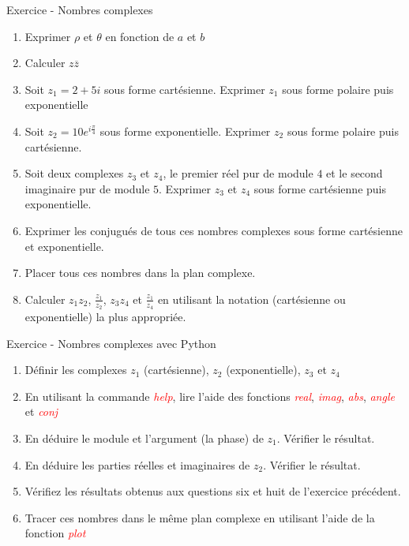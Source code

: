 \documentclass{beamer}
\newcounter{exampleBlockCounter}
\begin{document}
\begin{frame} 
	\begin{exampleblock}{Exercice  -  Nombres complexes}
		\begin{enumerate}\justifying
			  \item Exprimer $\rho$ et $\theta$ en fonction de $a$ et $b$
			  \item Calculer $z \overline{z}$
			  \item Soit $z_1=2+5i$ sous forme cartésienne. Exprimer $z_1$ sous forme
			  polaire puis exponentielle
			  \item Soit $z_2=10e^{i\frac{\pi}{4}}$ sous forme exponentielle. Exprimer
			  $z_2$ sous forme polaire puis cartésienne.
			  \item Soit deux complexes $z_3$ et $z_4$, le premier réel pur de module
			  $4$ et le second imaginaire pur de module $5$. Exprimer $z_3$ et $z_4$
			  sous forme cartésienne puis exponentielle.
			  \item Exprimer les conjugués de tous ces nombres complexes sous forme
			  cartésienne et exponentielle.
			  \item Placer tous ces nombres dans la plan complexe.
			  \item Calculer $z_1z_2$, $\frac{z_1}{z_2}$, $z_3z_4$ et $\frac{z_1}{z_4}$
			  en utilisant la notation (cartésienne ou exponentielle) la plus appropriée.
		\end{enumerate}
	\end{exampleblock}
\end{frame}
\begin{frame}
	\begin{exampleblock}{Exercice  - Nombres complexes avec Python}
		\begin{enumerate}\justifying
			  \item Définir les complexes $z_1$ (cartésienne), $z_2$ (exponentielle),
			  $z_3$ et $z_4$
			  \item En utilisant la commande \textit{\textcolor{red}{help}}, lire l'aide
			  des fonctions \textit{\textcolor{red}{real}},
			  \textit{\textcolor{red}{imag}}, \textit{\textcolor{red}{abs}},
			  \textit{\textcolor{red}{angle}} et \textit{\textcolor{red}{conj}}
			  \item En déduire le module et l'argument (la phase) de $z_1$. Vérifier le
			  résultat.
			  \item En déduire les parties réelles et imaginaires de $z_2$. Vérifier le
			  résultat.
			  \item Vérifiez les résultats obtenus aux questions six et huit de
			  l'exercice précédent.
			  \item Tracer ces nombres dans le même plan complexe en utilisant l'aide de
			  la fonction \textit{\textcolor{red}{plot}}
		\end{enumerate}
	\end{exampleblock}
\end{frame}
\end{document}
